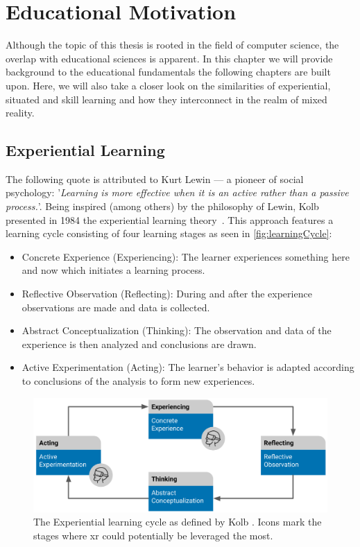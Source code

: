 %
\chapter{Educational Motivation \label{chap:concepts}}
Although the topic of this thesis is rooted in the field of computer science, the overlap with educational sciences is apparent. In this chapter we will provide background to the educational fundamentals the following chapters are built upon. Here, we will also take a closer look on the similarities of experiential, situated and skill learning and how they interconnect in the realm of mixed reality.


\section{Experiential Learning \label{sec:experiential}}
The following quote is attributed to Kurt Lewin --- a pioneer of social psychology: '\emph{Learning is more effective when it is an active rather than a passive process.}'. Being inspired (among others) by the philosophy of Lewin, Kolb presented in 1984 the experiential learning theory~\cite{kolb:1984:experiential}.
This approach features a learning cycle consisting of four learning stages as seen in \autoref{fig:learningCycle}:

\begin{itemize}
    \setlength{\itemsep}{-0.3cm}
    \item Concrete Experience (Experiencing): The learner experiences something here and now which initiates a learning process.
    \item Reflective Observation (Reflecting): During and after the experience observations are made and data is collected.
    \item Abstract Conceptualization (Thinking): The observation and data of the experience is then analyzed and conclusions are drawn.
    \item Active Experimentation (Acting): The learner's behavior is adapted according to conclusions of the analysis to form new experiences. 
\end{itemize}

\begin{figure}[h!bt]
	\centering
	\includegraphics[width=0.9\linewidth]{pictures/ExperientialLearningCycle2.png}
	\captionsetup{labelfont=bf,textfont=it}
	\caption[The Experiential learning cycle as defined by Kolb \cite{kolb:1984:experiential}.]{The Experiential learning cycle as defined by Kolb \cite{kolb:1984:experiential}. Icons mark the stages where \acrshort{xr} could potentially be leveraged the most.\label{fig:learningCycle}}
\end{figure}

